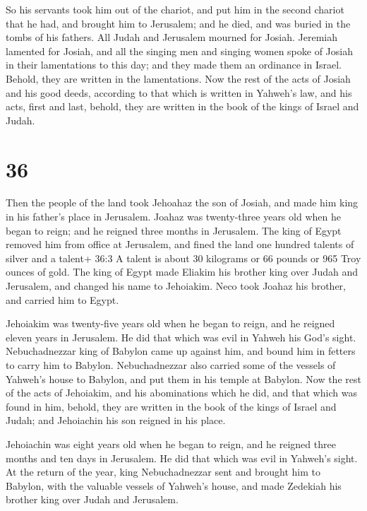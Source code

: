  So his servants took him out of the chariot, and put him
in the second chariot that he had, and brought him to Jerusalem; and he
died, and was buried in the tombs of his fathers. All Judah and
Jerusalem mourned for Josiah.  Jeremiah lamented for
Josiah, and all the singing men and singing women spoke of Josiah in
their lamentations to this day; and they made them an ordinance in
Israel. Behold, they are written in the lamentations.  Now
the rest of the acts of Josiah and his good deeds, according to that
which is written in Yahweh's law,  and his acts, first and
last, behold, they are written in the book of the kings of Israel and
Judah.

\hypertarget{section-35}{%
\section{36}\label{section-35}}

 Then the people of the land took Jehoahaz the son of
Josiah, and made him king in his father's place in Jerusalem.
 Joahaz was twenty-three years old when he began to reign;
and he reigned three months in Jerusalem.  The king of Egypt
removed him from office at Jerusalem, and fined the land one hundred
talents of silver and a talent+ 36:3 A talent is about 30 kilograms or
66 pounds or 965 Troy ounces of gold.  The king of Egypt
made Eliakim his brother king over Judah and Jerusalem, and changed his
name to Jehoiakim. Neco took Joahaz his brother, and carried him to
Egypt.

 Jehoiakim was twenty-five years old when he began to reign,
and he reigned eleven years in Jerusalem. He did that which was evil in
Yahweh his God's sight.  Nebuchadnezzar king of Babylon came
up against him, and bound him in fetters to carry him to Babylon.
 Nebuchadnezzar also carried some of the vessels of Yahweh's
house to Babylon, and put them in his temple at Babylon. 
Now the rest of the acts of Jehoiakim, and his abominations which he
did, and that which was found in him, behold, they are written in the
book of the kings of Israel and Judah; and Jehoiachin his son reigned in
his place.

 Jehoiachin was eight years old when he began to reign, and
he reigned three months and ten days in Jerusalem. He did that which was
evil in Yahweh's sight.  At the return of the year, king
Nebuchadnezzar sent and brought him to Babylon, with the valuable
vessels of Yahweh's house, and made Zedekiah his brother king over Judah
and Jerusalem.


